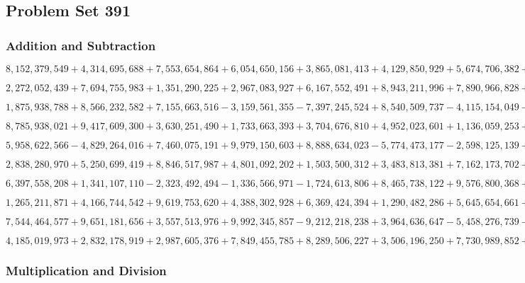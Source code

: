 \hypertarget{problem-set-391}{%
\subsection{Problem Set 391}\label{problem-set-391}}

\hypertarget{addition-and-subtraction}{%
\subsubsection{Addition and
Subtraction}\label{addition-and-subtraction}}

\(8,152,379,549+4,314,695,688+7,553,654,864+6,054,650,156+3,865,081,413+4,129,850,929+5,674,706,382+4,244,682,623+1,985,462,619+6,219,139,743\)

\(2,272,052,439+7,694,755,983+1,351,290,225+2,967,083,927+6,167,552,491+8,943,211,996+7,890,966,828+9,083,849,341+3,892,984,189+5,391,522,166\)

\(1,875,938,788+8,566,232,582+7,155,663,516-3,159,561,355-7,397,245,524+8,540,509,737-4,115,154,049-5,777,540,453+4,822,419,407+5,749,178,794\)

\(8,785,938,021+9,417,609,300+3,630,251,490+1,733,663,393+3,704,676,810+4,952,023,601+1,136,059,253+7,660,109,349+1,912,742,177+8,650,552,889\)

\(5,958,622,566-4,829,264,016+7,460,075,191+9,979,150,603+8,888,634,023-5,774,473,177-2,598,125,139+9,119,267,265-6,357,193,208+2,408,567,142\)

\(2,838,280,970+5,250,699,419+8,846,517,987+4,801,092,202+1,503,500,312+3,483,813,381+7,162,173,702+2,461,550,124+9,890,460,690+3,666,093,033\)

\(6,397,558,208+1,341,107,110-2,323,492,494-1,336,566,971-1,724,613,806+8,465,738,122+9,576,800,368+9,563,344,856+1,418,335,954-4,864,946,999\)

\(1,265,211,871+4,166,744,542+9,619,753,620+4,388,302,928+6,369,424,394+1,290,482,286+5,645,654,661+1,213,290,342+5,586,528,070+4,293,939,245\)

\(7,544,464,577+9,651,181,656+3,557,513,976+9,992,345,857-9,212,218,238+3,964,636,647-5,458,276,739-1,203,065,150-6,066,090,111+3,006,384,154\)

\(4,185,019,973+2,832,178,919+2,987,605,376+7,849,455,785+8,289,506,227+3,506,196,250+7,730,989,852+5,598,621,916+9,394,887,694+3,739,701,497\)

\hypertarget{multiplication-and-division}{%
\subsubsection{Multiplication and
Division}\label{multiplication-and-division}}

